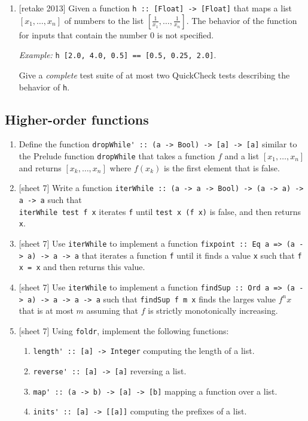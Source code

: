 \documentclass{article}
\def\code#1{\texttt{#1}}
\begin{document}
\begin{enumerate}
\item {[retake 2013]} Given a function \code{h :: [Float] -> [Float]} that maps a list $[x_1, \dots, x_n]$ of numbers to the list $[\frac{1}{x_1}, \dots, \frac{1}{x_n}]$. The behavior of the function for inputs that contain the number $0$ is not specified. \par
\textit{Example:} \code{h [2.0, 4.0, 0.5] == [0.5, 0.25, 2.0]}. \par
Give a \textit{complete} test suite of at most two QuickCheck tests describing the behavior of \code{h}.
\end{enumerate}

\subsection{Higher-order functions}
\begin{enumerate}
\item Define the function \verb|dropWhile' :: (a -> Bool) -> [a] -> [a]| similar to the Prelude function \verb|dropWhile| that takes a function $f$ and a list $[x_1, \dots, x_n]$ and returns $[x_k, \dots, x_n]$ where $f(x_k)$ is the first element that is false.

\item {[sheet 7]} Write a function \verb|iterWhile :: (a -> a -> Bool) -> (a -> a) -> a -> a| such that \\ \verb|iterWhile test f x| iterates \verb|f| until \verb|test x (f x)| is false, and then returns \verb|x|.

\item {[sheet 7]} Use \verb|iterWhile| to implement a function \verb|fixpoint :: Eq a => (a -> a) -> a -> a| that iterates a function \verb|f| until it finds a value \verb|x| such that \verb|f x = x| and then returns this value.

\item {[sheet 7]} Use \verb|iterWhile| to implement a function \verb|findSup :: Ord a => (a -> a) -> a -> a -> a| such that \verb|findSup f m x| finds the larges value $f^nx$ that is at most $m$ assuming that $f$ is strictly monotonically increasing.

\item {[sheet 7]} Using \verb|foldr|, implement the following functions:
\begin{enumerate}
\item \verb|length' :: [a] -> Integer| computing the length of a list.
\item \verb|reverse' :: [a] -> [a]| reversing a list.
\item \verb|map' :: (a -> b) -> [a] -> [b]| mapping a function over a list.
\item \verb|inits' :: [a] -> [[a]]| computing the prefixes of a list.
\end{enumerate}


\end{enumerate}
\end{document}

